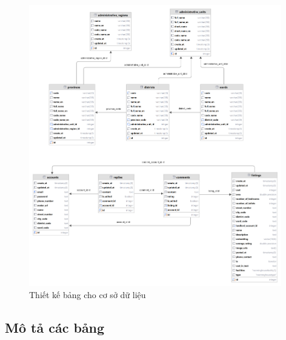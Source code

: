 \begin{figure}[H]
    \centering
    \includegraphics[width=0.98\textwidth]{Images/Database/Table.png}
    \caption{Thiết kế bảng cho cơ sở dữ liệu}
\end{figure}
\newpage
\subsection{Mô tả các bảng}
